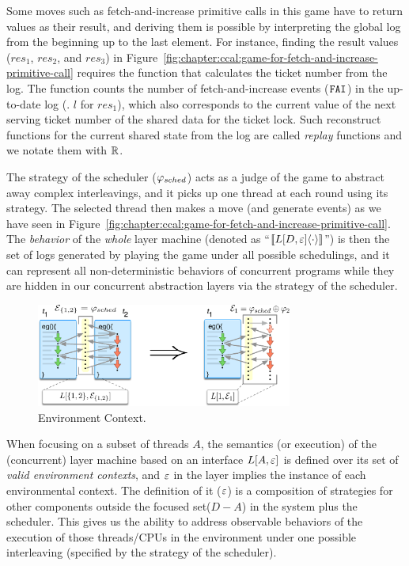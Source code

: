 Some moves such as fetch-and-increase primitive calls in this game have to return values as their result,
and deriving them is possible by interpreting the global log from the beginning up to the last element. 
For instance, finding the result values ($res_1$, $res_2$, and $res_3$) in Figure~\ref{fig:chapter:ccal:game-for-fetch-and-increase-primitive-call}
requires the function that calculates the ticket number from the log.
The function counts the number of fetch-and-increase events (${\mathrm{\texttt{FAI}}}$) in the up-to-date log (\eg. $l$ for $res_1$), which
also corresponds to the current value of the next serving ticket number of the shared data for the ticket lock.
Such reconstruct functions for the current shared state from the log are called \emph{replay} functions and we notate them with $\mathbb{R}$.

The strategy of the scheduler ($\varphi_{sched}$) acts as a judge of the game to abstract away complex interleavings, 
and it picks up one thread at each round using its strategy. 
The selected thread then makes a move  (and generate events)  as we have seen in Figure~\ref{fig:chapter:ccal:game-for-fetch-and-increase-primitive-call}.
The \emph{behavior} of the \emph{whole} layer machine (denoted as ``$[\![{L[D, {\varepsilon}]} \langle {\cdot} \rangle]\!]$'') 
is then the set of  logs generated by playing the game under all possible schedulings, and it can represent all non-deterministic behaviors of concurrent programs 
while they are hidden in our concurrent abstraction layers via the strategy of the scheduler.

\begin{figure}[t]
\centering
\includegraphics[width=0.75\textwidth]{figs/ccal/pcomp}
\caption{Environment Context.}
\label{fig:chapter:ccal:env-contexs}
\end{figure}

When focusing on a subset of threads $A$, the semantics (or execution) of the (concurrent) layer machine based on an
interface $L[A, {\varepsilon}]$ is defined over its set of \emph{valid environment
contexts}, and ${\varepsilon}$ in the layer implies the instance of each environmental context.
The definition of it (${\varepsilon}$) is
a composition  of strategies for other components outside  the focused set($D - A$) in the 
system plus the scheduler.
This gives us the ability to address observable behaviors of the
execution of those threads/CPUs in the environment under one possible
interleaving (specified by the strategy of the scheduler).

